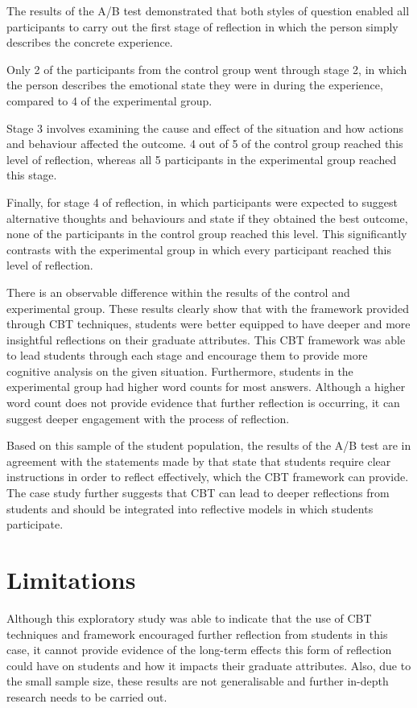 \documentclass{l4proj}
\begin{document}
The results of the A/B test demonstrated that both styles of question enabled all participants to carry out the first stage of reflection in which the person simply describes the concrete experience. 

Only 2 of the participants from the control group went through stage 2, in which the person describes the emotional state they were in during the experience, compared to 4 of the experimental group.

Stage 3 involves examining the cause and effect of the situation and how actions and behaviour affected the outcome. 4 out of 5 of the control group reached this level of reflection, whereas all 5 participants in the experimental group reached this stage.

Finally, for stage 4 of reflection, in which participants were expected to suggest alternative thoughts and behaviours and state if they obtained the best outcome, none of the participants in the control group reached this level. This significantly contrasts with the experimental group in which every participant reached this level of reflection.

There is an observable difference within the results of the control and experimental group. These results clearly show that with the framework provided through CBT techniques, students were better equipped to have deeper and more insightful reflections on their graduate attributes. This CBT framework was able to lead students through each stage and encourage them to provide more cognitive analysis on the given situation. Furthermore, students in the experimental group had higher word counts for most answers. Although a higher word count does not provide evidence that further reflection is occurring, it can suggest deeper engagement with the process of reflection. 

Based on this sample of the student population, the results of the A/B test are in agreement with the statements made by \citet{bruno_reflective_2018} that state that students require clear instructions in order to reflect effectively, which the CBT framework can provide. The case study further suggests that CBT can lead to deeper reflections from students and should be integrated into reflective models in which students participate.


\section{Limitations}

Although this exploratory study was able to indicate that the use of CBT techniques and framework encouraged further reflection from students in this case, it cannot provide evidence of the long-term effects this form of reflection could have on students and how it impacts their graduate attributes. Also, due to the small sample size, these results are not generalisable and further in-depth research needs to be carried out. 
\end{document}
